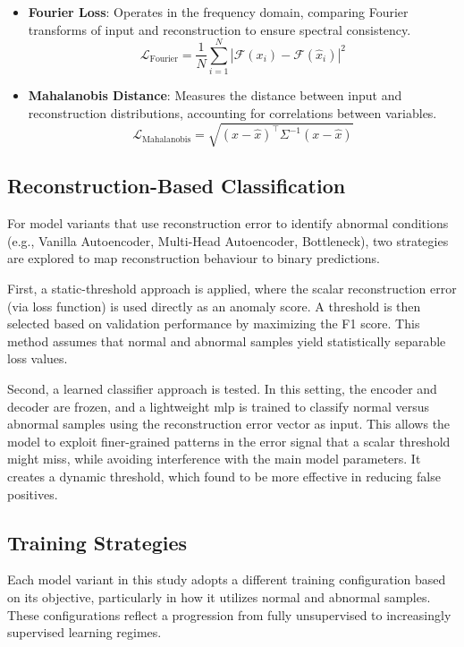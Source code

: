 \begin{itemize}
    \item \textbf{Fourier Loss}: Operates in the frequency domain, comparing Fourier transforms of input and reconstruction to ensure spectral consistency.
    \begin{equation}
        \mathcal{L}_{\text{Fourier}} = \frac{1}{N} \sum_{i=1}^N \left| \mathcal{F}(x_i) - \mathcal{F}(\hat{x}_i) \right|^2
    \end{equation}


    \item \textbf{Mahalanobis Distance}: Measures the distance between input and reconstruction distributions, accounting for correlations between variables.
    \begin{equation}
        \mathcal{L}_{\text{Mahalanobis}} = \sqrt{(x - \hat{x})^\top \Sigma^{-1} (x - \hat{x})}
    \end{equation}

\end{itemize}


\subsection{Reconstruction-Based Classification}
For model variants that use reconstruction error to identify abnormal conditions (e.g., Vanilla Autoencoder, Multi-Head Autoencoder, Bottleneck), two strategies are explored to map reconstruction behaviour to binary predictions.

First, a static-threshold approach is applied, where the scalar reconstruction error (via loss function) is used directly as an anomaly score.
A threshold is then selected based on validation performance by maximizing the F1 score.
This method assumes that normal and abnormal samples yield statistically separable loss values.

Second, a learned classifier approach is tested.
In this setting, the encoder and decoder are frozen, and a lightweight \gls{mlp} is trained to classify normal versus abnormal samples using the reconstruction error vector as input.
This allows the model to exploit finer-grained patterns in the error signal that a scalar threshold might miss, while avoiding interference with the main model parameters.
It creates a dynamic threshold, which \cite{zhao_anomaly_2018} found to be more effective in reducing false positives.


\subsection{Training Strategies}
\label{subsec:training-strategies}
Each model variant in this study adopts a different training configuration based on its objective, particularly in how it utilizes normal and abnormal samples.
These configurations reflect a progression from fully unsupervised to increasingly supervised learning regimes.

